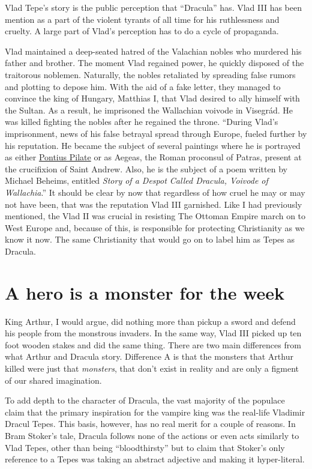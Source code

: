 \documentclass[
]{article}
\begin{document}
Vlad Tepe's story is the public perception that ``Dracula'' has. Vlad
III has been mention as a part of the violent tyrants of all time for
his ruthlessness and cruelty. A large part of Vlad's perception has to
do a cycle of propaganda.

Vlad maintained a deep-seated hatred of the Valachian nobles who
murdered his father and brother. The moment Vlad regained power, he
quickly disposed of the traitorous noblemen. Naturally, the nobles
retaliated by spreading false rumors and plotting to depose him. With
the aid of a fake letter, they managed to convince the king of Hungary,
Matthias I, that Vlad desired to ally himself with the Sultan. As a
result, he imprisoned the Wallachian voivode in Visegrád. He was killed
fighting the nobles after he regained the throne. ``During Vlad's
imprisonment, news of his false betrayal spread through Europe, fueled
further by his reputation. He became the subject of several paintings
where he is portrayed as either
\href{https://www.thecollector.com/pontius-pilate-the-man-who-sentenced-jesus-christ-to-death/}{Pontius
Pilate} or as Aegeas, the Roman proconsul of Patras, present at the
crucifixion of Saint Andrew. Also, he is the subject of a poem written
by Michael Beheims, entitled \emph{Story of a Despot Called Dracula,
Voivode of Wallachia}.'' It should be clear by now that regardless of
how cruel he may or may not have been, that was the reputation Vlad III
garnished. Like I had previously mentioned, the Vlad II was crucial in
resisting The Ottoman Empire march on to West Europe and, because of
this, is responsible for protecting Christianity as we know it now. The
same Christianity that would go on to label him as Tepes as Dracula.

\hypertarget{a-hero-is-a-monster-for-the-week}{%
\section{A hero is a monster for the
week}\label{a-hero-is-a-monster-for-the-week}}

King Arthur, I would argue, did nothing more than pickup a sword and
defend his people from the monstrous invaders. In the same way, Vlad III
picked up ten foot wooden stakes and did the same thing. There are two
main differences from what Arthur and Dracula story. Difference A is
that the monsters that Arthur killed were just that \emph{monsters},
that don't exist in reality and are only a figment of our shared
imagination.

To add depth to the character of Dracula, the vast majority of the
populace claim that the primary inspiration for the vampire king was the
real-life Vladimir Dracul Tepes. This basis, however, has no real merit
for a couple of reasons. In Bram Stoker's tale, Dracula follows none of
the actions or even acts similarly to Vlad Tepes, other than being
``bloodthirsty'' but to claim that Stoker's only reference to a Tepes
was taking an abstract adjective and making it hyper-literal.
\end{document}
